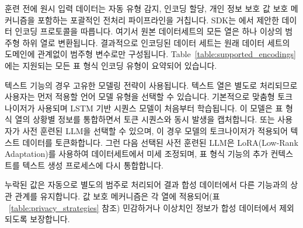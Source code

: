 훈련 전에 원시 입력 데이터는 자동 유형 감지, 인코딩 할당, 개인 정보 보호 값 보호 메커니즘을 포함하는 포괄적인 전처리 파이프라인을 거칩니다.
SDK는 \cite{tabularargn}에서 제안한 데이터 인코딩 프로토콜을 따릅니다.
여기서 원본 데이터세트의 모든 열은 하나 이상의 범주형 하위 열로 변환됩니다.
결과적으로 인코딩된 데이터 세트는 원래 데이터 세트의 도메인에 관계없이 범주형 변수로만 구성됩니다. Table~\ref{table:supported_encodings}에는 지원되는 모든 표 형식 인코딩 유형이 요약되어 있습니다.

텍스트 기능의 경우 고유한 모델링 전략이 사용됩니다. 텍스트 열은 별도로 처리되므로 사용자는 먼저 적용할 언어 모델 유형을 선택할 수 있습니다. 기본적으로 맞춤형 토크나이저가 사용되며 LSTM 기반 시퀀스 모델이 처음부터 학습됩니다. 이 모델은 표 형식 열의 상황별 정보를 통합하면서 토큰 시퀀스와 동시 발생을 캡처합니다. 또는 사용자가 사전 훈련된 LLM을 선택할 수 있으며, 이 경우 모델의 토크나이저가 적용되어 텍스트 데이터를 토큰화합니다. 그런 다음 선택된 사전 훈련된 LLM은 LoRA(Low-Rank Adaptation)를 사용하여 데이터세트에서 미세 조정되며, 표 형식 기능의 추가 컨텍스트를 텍스트 생성 프로세스에 다시 통합합니다.

누락된 값은 자동으로 별도의 범주로 처리되어 결과 합성 데이터에서 다른 기능과의 상관 관계를 유지합니다. 값 보호 메커니즘은 각 열에 적용되어(표 ~\ref{table:privacy_strategies} 참조) 민감하거나 이상치인 정보가 합성 데이터에서 제외되도록 보장합니다.



